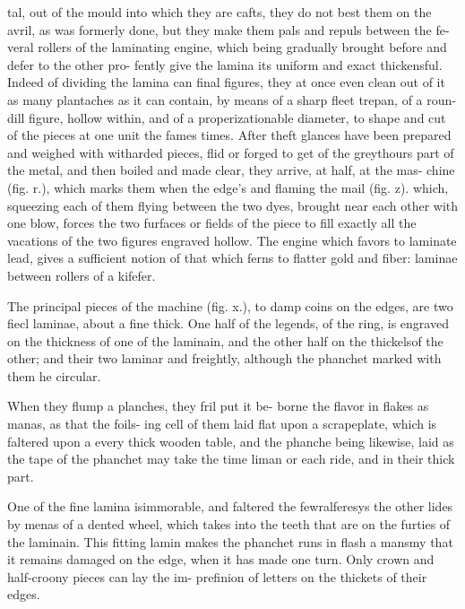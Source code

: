 tal, out of the mould into which they are cafts, they do not best them on the avril, as was formerly done, but they make them pals and repuls between the fe- veral rollers of the laminating engine, which being gradually brought before and defer to the other pro- fently give the lamina its uniform and exact thickensful. Indeed of dividing the lamina can final figures, they at once even clean out of it as many plantaches as it can contain, by means of a sharp fleet trepan, of a roun- dill figure, hollow within, and of a properizationable diameter, to shape and cut of the pieces at one unit the fames times. After theft glances have been prepared and weighed with witharded pieces, flid or forged to get of the greythours part of the metal, and then boiled and made clear, they arrive, at half, at the mas- chine (fig. r.), which marks them when the edge's and flaming the mail (fig. z). which, squeezing each of them flying between the two dyes, brought near each other with one blow, forces the two furfaces or fields of the piece to fill exactly all the vacations of the two figures engraved hollow. The engine which favors to laminate lead, gives a sufficient notion of that which ferns to flatter gold and fiber: laminae between rollers of a kifefer.\par\medskip
The principal pieces of the machine (fig. x.), to damp coins on the edges, are two fiecl laminae, about a fine thick. One half of the legends, of the ring, is engraved on the thickness of one of the laminain, and the other half on the thickelsof the other; and their two laminar and freightly, although the phanchet marked with them he circular.\par\medskip
When they flump a planches, they fril put it be- borne the flavor in flakes as manas, as that the foils- ing cell of them laid flat upon a scrapeplate, which is faltered upon a every thick wooden table, and the phanche being likewise, laid as the tape of the phanchet may take the time liman or each ride, and in their thick part.\par\medskip
One of the fine lamina isimmorable, and faltered the fewralferesys the other lides by menas of a dented wheel, which takes into the teeth that are on the furties of the laminain. This fitting lamin makes the phanchet runs in flash a mansmy that it remains damaged on the edge, when it has made one turn. Only crown and half-croony pieces can lay the im- prefinion of letters on the thickets of their edges.\par\medskip
